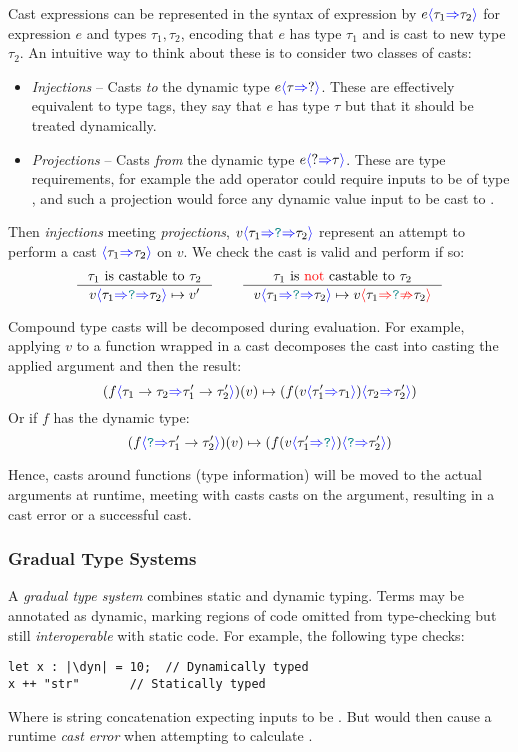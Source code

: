 Cast expressions can be represented in the syntax of expression by $e{\color{blue}\langle} \tau_1 {\color{blue}\Rightarrow} \tau_2 {\color{blue}\rangle}$ for expression $e$ and types $\tau_1, \tau_2$, encoding that $e$ has type $\tau_1$ and is cast to new type $\tau_2$. An intuitive way to think about these is to consider two classes of casts:
\begin{itemize}
\item \textit{Injections} -- Casts \textit{to} the dynamic type $e{\color{blue}\langle} \tau {\color{blue}\Rightarrow} ? {\color{blue}\rangle}$. These are effectively equivalent to type tags, they say that $e$ has type $\tau$ but that it should be treated dynamically.
\item \textit{Projections} -- Casts \textit{from} the dynamic type $e{\color{blue}\langle} ? {\color{blue}\Rightarrow} \tau {\color{blue}\rangle}$. These are type requirements, for example the add operator could require inputs to be of type , and such a projection would force any dynamic value input to be cast to . 
\end{itemize}
Then \textit{injections} meeting \textit{projections}, $v{\color{blue}\langle} \tau_1 {\color{blue}\Rightarrow} {\color{teal}\texttt{?}} {\color{blue}\Rightarrow} \tau_2 {\color{blue}\rangle}$ represent an attempt to perform a cast ${\color{blue}\langle} \tau_1 {\color{blue}\Rightarrow} \tau_2 {\color{blue}\rangle}$ on $v$. We check the cast is valid and perform if so:
\[\inference{\tau_1 \text{ is castable to } \tau_2}{v\scastcast{\tau_1}{\dyn}{\tau_2} \mapsto v'} \qquad \inference{\tau_1  \text{ is {\color{red} not }castable to }  \tau_2}{v\scastcast{\tau_1}{\dyn}{\tau_2} \mapsto v\scasterror{\tau_1}{\tau_2}}\]


Compound type casts will be decomposed during evaluation. For example, applying $v$ to a function wrapped in a cast decomposes the cast into casting the applied argument and then the result:
\[(f{\color{blue}\langle} \tau_1 \to \tau_2 {\color{blue}\Rightarrow} \tau_1' \to \tau_2' {\color{blue}\rangle})(v) \mapsto (f(v {\color{blue}\langle} \tau_1' {\color{blue}\Rightarrow} \tau_1 {\color{blue}\rangle}){\color{blue}\langle} \tau_2 {\color{blue}\Rightarrow} \tau_2' {\color{blue}\rangle})\]
Or if $f$ has the dynamic type:
\[(f{\color{blue}\langle} {\color{teal}\texttt{?}} {\color{blue}\Rightarrow} \tau_1' \to \tau_2' {\color{blue}\rangle})(v) \mapsto (f(v {\color{blue}\langle} \tau_1' {\color{blue}\Rightarrow} {\color{teal}\texttt{?}} {\color{blue}\rangle}){\color{blue}\langle} {\color{teal}\texttt{?}} {\color{blue}\Rightarrow} \tau_2' {\color{blue}\rangle})\]

Hence, casts around functions (type information) will be moved to the actual arguments at runtime, meeting with casts casts on the argument, resulting in a cast error or a successful cast.

\subsubsection{Gradual Type Systems}\label{sec:GradualTypeSystem}

A \textit{gradual type system} \cite{GradualRefined, GradualFunctional} combines static and dynamic typing. Terms may be annotated as dynamic, marking regions of code omitted from type-checking but still \textit{interoperable} with static code. For example, the following type checks:
\begin{verbatim}
let x : |\dyn| = 10;  // Dynamically typed
x ++ "str"       // Statically typed
\end{verbatim}
Where \code{++} is string concatenation expecting inputs to be . But would then cause a runtime \textit{cast error} when attempting to calculate .

